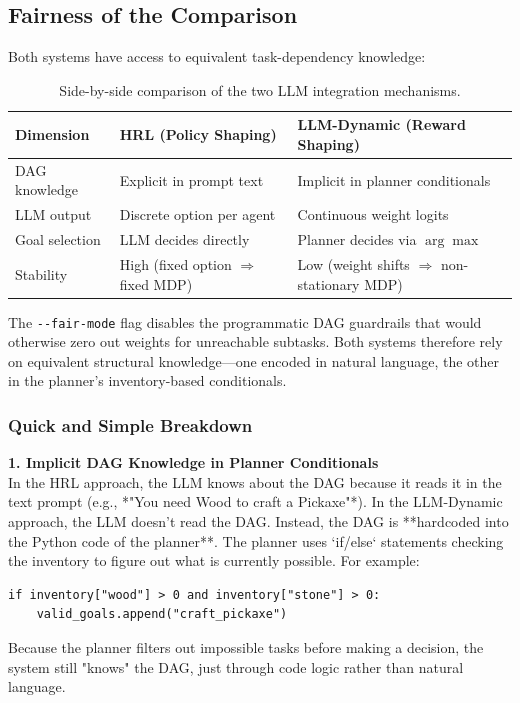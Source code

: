 \documentclass{article}
\begin{document}
\subsection{Fairness of the Comparison}

Both systems have access to equivalent task-dependency knowledge:

\begin{table}[htbp]
\centering
\begin{tabular}{@{}lll@{}}
\toprule
\textbf{Dimension} & \textbf{HRL (Policy Shaping)} & \textbf{LLM-Dynamic (Reward Shaping)} \\
\midrule
DAG knowledge & Explicit in prompt text & Implicit in planner conditionals \\
LLM output    & Discrete option per agent & Continuous weight logits \\
Goal selection & LLM decides directly & Planner decides via $\arg\max$ \\
Stability      & High (fixed option $\Rightarrow$ fixed MDP) & Low (weight shifts $\Rightarrow$ non-stationary MDP) \\
\bottomrule
\end{tabular}
\caption{Side-by-side comparison of the two LLM integration mechanisms.}
\end{table}

The \texttt{-{}-fair-mode} flag disables the programmatic DAG guardrails that would otherwise zero out weights for unreachable subtasks.  Both systems therefore rely on equivalent structural knowledge---one encoded in natural language, the other in the planner's inventory-based conditionals.

\subsubsection{Quick and Simple Breakdown}

\textbf{1. Implicit DAG Knowledge in Planner Conditionals} \\
In the HRL approach, the LLM knows about the DAG because it reads it in the text prompt (e.g., *"You need Wood to craft a Pickaxe"*). 
In the LLM-Dynamic approach, the LLM doesn't read the DAG. Instead, the DAG is **hardcoded into the Python code of the planner**. The planner uses `if/else` statements checking the inventory to figure out what is currently possible. For example: 
\begin{verbatim}
if inventory["wood"] > 0 and inventory["stone"] > 0: 
    valid_goals.append("craft_pickaxe") 
\end{verbatim}
Because the planner filters out impossible tasks before making a decision, the system still "knows" the DAG, just through code logic rather than natural language.
\end{document}
